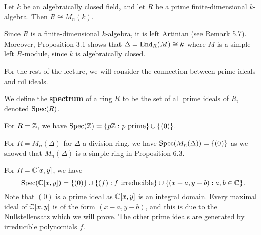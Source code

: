 \begin{cor}{}
Let $k$ be an algebraically closed field, and let $R$ be a prime finite-dimensional $k$-algebra. Then 
$R \cong M_n(k)$. 
\end{cor}
\begin{pf}
Since $R$ is a finite-dimensional $k$-algebra, it is left Artinian (see Remark 5.7). Moreover,
Proposition 3.1 shows that $\Delta = \operatorname{End}_R(M) \cong k$ where $M$ is a simple left 
$R$-module, since $k$ is algebraically closed. 
\end{pf}

For the rest of the lecture, we will consider the connection between prime ideals and nil ideals. 

\begin{defn}{}
We define the {\bf spectrum} of a ring $R$ to be the set of all prime ideals of $R$,
denoted $\operatorname{Spec}(R)$. 
\end{defn}

\begin{exmp}{}
For $R = \mathbb{Z}$, we have $\operatorname{Spec}(\mathbb{Z}) = \{p\mathbb{Z} : p \text{ prime}\} \cup \{(0)\}$. 
\end{exmp}

\begin{exmp}{}
For $R = M_n(\Delta)$ for $\Delta$ a division ring, we have $\operatorname{Spec}(M_n(\Delta)) = \{(0)\}$ as we 
showed that $M_n(\Delta)$ is a simple ring in Proposition 6.3.
\end{exmp}

\begin{exmp}{}
For $R = \mathbb{C}[x, y]$, we have
\[ \operatorname{Spec}(\mathbb{C}[x, y]) = \{(0)\} \cup \{(f) : f \text{ irreducible}\} \cup \{(x-a, y-b) : a, b \in \mathbb{C}\}. \]
Note that $(0)$ is a prime ideal as $\mathbb{C}[x, y]$ is an integral domain. Every maximal ideal of 
$\mathbb{C}[x, y]$ is of the form $(x-a, y-b)$, and this is due to the Nullstellensatz which we will prove. 
The other prime ideals are generated by irreducible polynomials $f$. 
\end{exmp}

